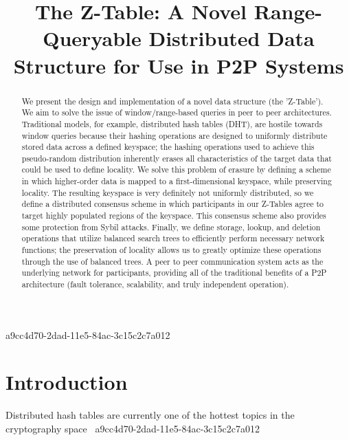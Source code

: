 \documentclass[12pt]{article}
\title{The Z-Table: A Novel Range-Queryable Distributed Data Structure for Use in P2P Systems}
\begin{document}
\maketitle

\begin{abstract}
We present the design and implementation of a novel data structure (the 'Z-Table'). We aim to solve the issue of window/range-based queries in peer to peer architectures. Traditional models, for example,  distributed hash tables (DHT), are hostile towards window queries because their hashing operations are designed to uniformly distribute stored data across a defined keyspace; the hashing operations used to achieve this pseudo-random distribution inherently erases all characteristics of the target data that could be used to define locality. We solve this problem of erasure by defining a scheme in which higher-order data is mapped to a first-dimensional keyspace, while preserving locality. The resulting keyspace is very definitely not uniformly distributed, so we define a distributed consensus scheme in which participants in our Z-Tables agree to target highly populated regions of the keyspace. This consensus scheme also provides some protection from Sybil attacks. Finally, we define storage, lookup, and deletion operations that utilize balanced search trees to efficiently perform necessary network functions; the preservation of locality allows us to greatly optimize these operations through the use of balanced trees. A peer to peer communication system acts as the underlying network for participants, providing all of the traditional benefits of a P2P architecture (fault tolerance, scalability, and truly independent operation).
\end{abstract}

a9cc4d70-2dad-11e5-84ac-3c15c2c7a012
\newpage
\section{Introduction}
Distributed hash tables are currently one of the hottest topics in the cryptography space~\cite{Stoica:2001dj,Rowstron:2001ea,Ratnasamy:2001wn}
a9cc4d70-2dad-11e5-84ac-3c15c2c7a012
\printbibliography
\end{document}
